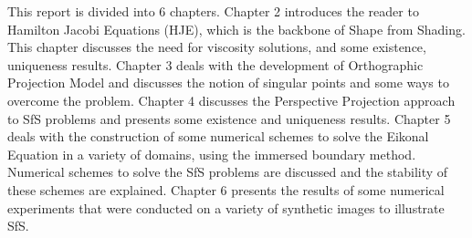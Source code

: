  \noindent
 This report is divided into 6 chapters. Chapter 2 introduces the reader to Hamilton Jacobi Equations (HJE), which is the backbone of Shape from Shading. This chapter discusses the need for viscosity solutions, and some existence, uniqueness results. Chapter 3 deals with the development of Orthographic Projection Model and discusses the notion of singular points and some ways to overcome the problem. Chapter 4 discusses the Perspective Projection approach to SfS problems and presents some existence and uniqueness results. Chapter 5 deals with the construction of some numerical schemes to solve the Eikonal Equation in a variety of domains, using the immersed boundary method. Numerical schemes to solve the SfS problems are discussed and the stability of these schemes are explained. Chapter 6 presents the results of some numerical experiments that were conducted on a variety of synthetic images to illustrate SfS.
